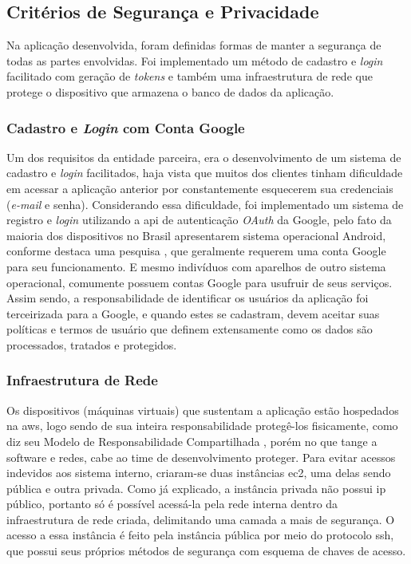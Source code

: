 \subsection{Critérios de Segurança e Privacidade}
Na aplicação desenvolvida, foram definidas formas de manter a segurança de todas as partes envolvidas. Foi implementado um método de cadastro e \textit{login} facilitado com geração de \textit{tokens} e também uma infraestrutura de rede que protege o dispositivo que armazena o banco de dados da aplicação.

\subsubsection{Cadastro e \emph{Login} com Conta Google}
Um dos requisitos da entidade parceira, era o desenvolvimento de um sistema de cadastro e \emph{login} facilitados, haja vista que muitos dos clientes tinham dificuldade em acessar a aplicação anterior por constantemente esquecerem sua credenciais (\emph{e-mail} e senha).
Considerando essa dificuldade, foi implementado um sistema de registro e \emph{login} utilizando a \gls{api} de autenticação \emph{OAuth} da Google, pelo fato da maioria dos dispositivos no Brasil apresentarem sistema operacional Android, conforme destaca uma pesquisa \cite{app-my-site}, que geralmente requerem uma conta Google para seu funcionamento. E mesmo indivíduos com aparelhos de outro sistema operacional, comumente possuem contas Google para usufruir de seus serviços.
Assim sendo, a responsabilidade de identificar os usuários da aplicação foi terceirizada para a Google, e quando estes se cadastram, devem aceitar suas políticas e termos de usuário que definem extensamente como os dados são processados, tratados e protegidos.

\subsubsection{Infraestrutura de Rede}
Os dispositivos (máquinas virtuais) que sustentam a aplicação estão hospedados na \gls{aws}, logo sendo de sua inteira responsabilidade protegê-los fisicamente, como diz seu Modelo de Responsabilidade Compartilhada \cite{aws-shared-responsibilities}, porém no que tange a software e redes, cabe ao time de desenvolvimento proteger.
Para evitar acessos indevidos aos sistema interno, criaram-se duas instâncias \gls{ec2}, uma delas sendo pública e outra privada. Como já explicado, a instância privada não possui \gls{ip} público, portanto só é possível acessá-la pela rede interna dentro da infraestrutura de rede criada, delimitando uma camada a mais de segurança.
O acesso a essa instância é feito pela instância pública por meio do protocolo \gls{ssh}, que possui seus próprios métodos de segurança com esquema de chaves de acesso.

